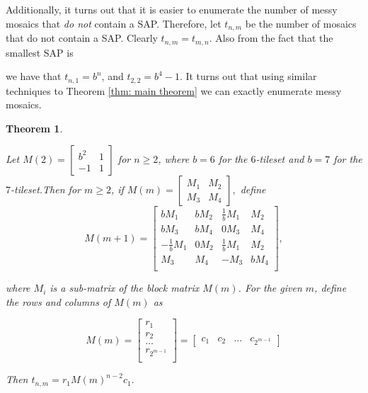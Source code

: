 \documentclass[12pt]{article}
\theoremstyle{plain}
\newtheorem{thm}{Theorem}
\theoremstyle{definition}
\theoremstyle{remark}
\theoremstyle{definition}
\newcommand{\cellA}[4]{ \draw[thick] ( #1 , #2 ) rectangle ( #3 , #4 ); \draw[red, thick] (#3 * 0.5 + #1 * 0.5 , #2) -- (#3, #4 * 0.5 + #2 * 0.5);}
\newcommand{\cellB}[4]{ \draw[thick] ( #1 , #2 ) rectangle ( #3 , #4 ); \draw[red, thick] (#3 * 0.5 + #1 * 0.5 , #2) -- (#1, #4 * 0.5 + #2 * 0.5);}
\newcommand{\cellC}[4]{ \draw[thick] ( #1 , #2 ) rectangle ( #3 , #4 ); \draw[red, thick] (#3 * 0.5 + #1 * 0.5 , #4) -- (#1, #4 * 0.5 + #2 * 0.5);}
\newcommand{\cellD}[4]{ \draw[thick] ( #1 , #2 ) rectangle ( #3 , #4 ); \draw[red, thick] (#3 * 0.5 + #1 * 0.5 , #4) -- (#3, #4 * 0.5 + #2 * 0.5);}
\begin{document}
Additionally, it turns out that it is easier to enumerate the number of messy mosaics that \textit{do not} contain a SAP. Therefore, let $t_{n,m}$ be the number of mosaics that do not contain a SAP. Clearly $t_{n,m}=t_{m,n}.$ Also from the fact that the smallest SAP is

\begin{center}
\end{center}

we have that $t_{n,1}=b^n$, and $t_{2,2} = b^4 - 1$. It turns out that using similar techniques to Theorem \ref{thm: main theorem} we can exactly enumerate messy mosaics. 

\begin{thm}
\label{thm: messy mosaics}

Let $
M(2) = \begin{bmatrix}
b^2 & 1 \\
-1 & 1
\end{bmatrix}
$ for $n \geq 2$, where $b = 6$ for the $6$-tileset and $b = 7$ for the $7$-tileset.Then for $m \geq 2$, if
$
M(m) = \begin{bmatrix}
M_1 & M_2 \\
M_3 & M_4
\end{bmatrix},
$ define
$$
M(m+1) = \begin{bmatrix}
bM_1 & bM_2 & \frac{1}{b}M_1 & M_2 \\
bM_3 & bM_4 & 0M_3 & M_4 \\
-\frac{1}{b}M_1 & 0M_2 & \frac{1}{b}M_1 & M_2 \\
M_3 & M_4 & -M_3 & bM_4 \\
\end{bmatrix},
$$

where $M_i$ is a sub-matrix of the block matrix $M(m)$. For the given $m$, define the rows and columns of $M(m)$ as

$$
M(m) = 
\begin{bmatrix}
    r_1 \\
    r_2 \\
    ... \\
    r_{2^{m-1}} \\
\end{bmatrix} =
\begin{bmatrix}
    c_1 & c_2 & ... & c_{2^{m-1}}
\end{bmatrix} 
$$

Then $t_{n,m} = r_1 M(m)^{n-2}c_1 .$
\end{thm}
\end{document}
